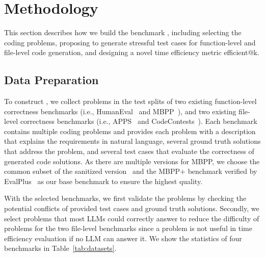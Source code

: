 \section{Methodology}\label{sec:meth}

This section describes how we build the benchmark \bench, including selecting the coding problems, proposing \tool to generate stressful test cases for function-level and file-level code generation, and designing a novel time efficiency metric efficient@k.

\subsection{Data Preparation}\label{sec:data}


To construct \bench, we collect problems in the test splits of two existing function-level correctness benchmarks (i.e., HumanEval~\cite{humaneval} and MBPP~\cite{mbpp}), and two existing file-level correctness benchmarks (i.e., APPS~\cite{apps} and CodeContests~\cite{codecontests}). Each benchmark contains multiple coding problems and provides each problem with a description that explains the requirements in natural language, several ground truth solutions that address the problem, and several test cases that evaluate the correctness of generated code solutions. As there are multiple versions for MBPP, we choose the common subset of the sanitized version~\cite{mbppsantized} and the MBPP+ benchmark verified by EvalPlus~\cite{mbppplus} as our base benchmark to ensure the highest quality. 

With the selected benchmarks, we first validate the problems by checking the potential conflicts of provided test cases and ground truth solutions. Secondly, we select problems that most LLMs could correctly answer to reduce the difficulty of problems for the two file-level benchmarks since a problem is not useful in time efficiency evaluation if no LLM can answer it. We show the statistics of four benchmarks in Table~\ref{tab:datasets}.



